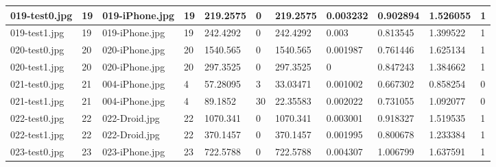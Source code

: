 \begin{landscape}
\begin{longtable}{|p{2cm}|p{1cm}|p{2cm}|p{1cm}|p{2cm}|p{1cm}|p{2cm}|p{2cm}|p{2cm}|p{2cm}|p{1cm}|}
		019-test0.jpg   & 19               & 019-iPhone.jpg        & 19                          & 219.2575              & 0                       & 219.2575                   & 0.003232              & 0.902894              & 1.526055                 & 1                \\ \hline
		019-test1.jpg   & 19               & 019-iPhone.jpg        & 19                          & 242.4292              & 0                       & 242.4292                   & 0.003                 & 0.813545              & 1.399522                 & 1                \\ \hline
		020-test0.jpg   & 20               & 020-iPhone.jpg        & 20                          & 1540.565              & 0                       & 1540.565                   & 0.001987              & 0.761446              & 1.625134                 & 1                \\ \hline
		020-test1.jpg   & 20               & 020-iPhone.jpg        & 20                          & 297.3525              & 0                       & 297.3525                   & 0                     & 0.847243              & 1.384662                 & 1                \\ \hline
		021-test0.jpg   & 21               & 004-iPhone.jpg        & 4                           & 57.28095              & 3                       & 33.03471                   & 0.001002              & 0.667302              & 0.858254                 & 0                \\ \hline
		021-test1.jpg   & 21               & 004-iPhone.jpg        & 4                           & 89.1852               & 30                      & 22.35583                   & 0.002022              & 0.731055              & 1.092077                 & 0                \\ \hline
		022-test0.jpg   & 22               & 022-Droid.jpg         & 22                          & 1070.341              & 0                       & 1070.341                   & 0.003001              & 0.918327              & 1.519535                 & 1                \\ \hline
		022-test1.jpg   & 22               & 022-Droid.jpg         & 22                          & 370.1457              & 0                       & 370.1457                   & 0.001995              & 0.800678              & 1.233384                 & 1                \\ \hline
		023-test0.jpg   & 23               & 023-iPhone.jpg        & 23                          & 722.5788              & 0                       & 722.5788                   & 0.004307              & 1.006799              & 1.637591                 & 1                \\ \hline

\end{longtable}
\end{landscape}
